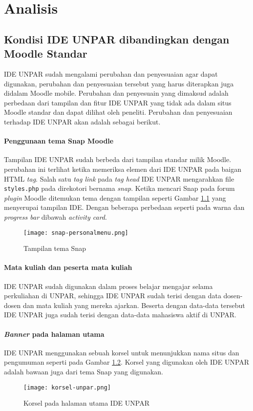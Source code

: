 \chapter{Analisis}
\label{chap:analsa}

\section{Kondisi IDE UNPAR dibandingkan dengan Moodle Standar}
\label{sec:Kondisi IDE UNPAR} 
IDE UNPAR sudah mengalami perubahan dan penyesuaian agar dapat digunakan, perubahan dan penyesuaian tersebut yang harus diterapkan juga didalam Moodle mobile. Perubahan dan penyesuain yang dimaksud adalah perbedaan dari tampilan dan fitur IDE UNPAR yang tidak ada dalam situs Moodle standar dan dapat dilihat oleh peneliti. Perubahan dan penyesuaian terhadap IDE UNPAR akan adalah sebagai berikut\cite{IDEUNPAR}.

\subsubsection {Penggunaan tema Snap Moodle}
	Tampilan IDE UNPAR sudah berbeda dari tampilan standar milik Moodle. perubahan ini terlihat ketika memeriksa elemen dari IDE UNPAR pada baigan HTML \textit{tag}. Salah satu \textit{tag link} pada \textit{tag head} IDE UNPAR mengarahkan file \texttt{styles.php} pada direkotori bernama \textit{snap}. Ketika mencari Snap pada forum \textit{plugin} Moodle ditemukan tema dengan tampilan seperti Gambar \ref{fig:snap-personal} yang menyerupai tampilan IDE. Dengan beberapa perbedaan seperti pada warna dan \textit{progress bar} dibawah \textit{activity card}.

\begin{figure}[H] 
	\centering  
	\texttt{[image: snap-personalmenu.png]}  
	\caption[Halaman \textit{Featured Courses}] {Tampilan tema Snap} 
	\label{fig:snap-personal} 
\end{figure} 
\subsubsection {Mata kuliah dan peserta mata kuliah}
IDE UNPAR sudah digunakan dalam proses belajar mengajar selama perkuliahan di UNPAR, sehingga IDE UNPAR sudah terisi dengan data dosen-dosen dan mata kuliah yang mereka ajarkan. Beserta dengan data-data tersebut IDE UNPAR juga sudah terisi dengan data-data mahasiswa aktif di UNPAR.
\subsubsection {\textit{Banner} pada halaman utama}
IDE UNPAR menggunakan sebuah korsel untuk menunjukkan nama situs dan pengumuman seperti pada Gambar \ref{fig:korsel-unpar}. Korsel yang digunakan oleh IDE UNPAR adalah bawaan juga dari tema Snap yang digunakan.
\begin{figure}[H] 
	\centering  
	\texttt{[image: korsel-unpar.png]}  
	\caption[Korsel pada halaman utama] {Korsel pada halaman utama IDE UNPAR} 
	\label{fig:korsel-unpar} 
\end{figure}
